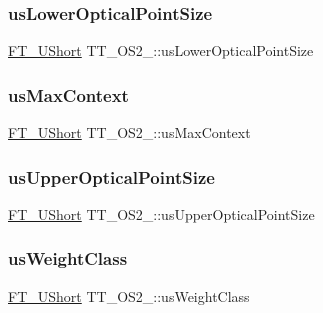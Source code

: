 \subsubsection{\texorpdfstring{us\+Lower\+Optical\+Point\+Size}{usLowerOpticalPointSize}}
{\footnotesize\ttfamily \hyperlink{fttypes_8h_a937f6c17cf5ffd09086d8610c37b9f58}{F\+T\+\_\+\+U\+Short} T\+T\+\_\+\+O\+S2\+\_\+\+::us\+Lower\+Optical\+Point\+Size}

\mbox{\label{struct_t_t___o_s2___a167313e407c77db2c4ca5a987f3a1482}} 
\subsubsection{\texorpdfstring{us\+Max\+Context}{usMaxContext}}
{\footnotesize\ttfamily \hyperlink{fttypes_8h_a937f6c17cf5ffd09086d8610c37b9f58}{F\+T\+\_\+\+U\+Short} T\+T\+\_\+\+O\+S2\+\_\+\+::us\+Max\+Context}

\mbox{\label{struct_t_t___o_s2___a8b068c0e31e8c8de527f010b9860d2ae}} 
\subsubsection{\texorpdfstring{us\+Upper\+Optical\+Point\+Size}{usUpperOpticalPointSize}}
{\footnotesize\ttfamily \hyperlink{fttypes_8h_a937f6c17cf5ffd09086d8610c37b9f58}{F\+T\+\_\+\+U\+Short} T\+T\+\_\+\+O\+S2\+\_\+\+::us\+Upper\+Optical\+Point\+Size}

\mbox{\label{struct_t_t___o_s2___af4d8ab32a27382ea95b882d9e2615ec9}} 
\subsubsection{\texorpdfstring{us\+Weight\+Class}{usWeightClass}}
{\footnotesize\ttfamily \hyperlink{fttypes_8h_a937f6c17cf5ffd09086d8610c37b9f58}{F\+T\+\_\+\+U\+Short} T\+T\+\_\+\+O\+S2\+\_\+\+::us\+Weight\+Class}


